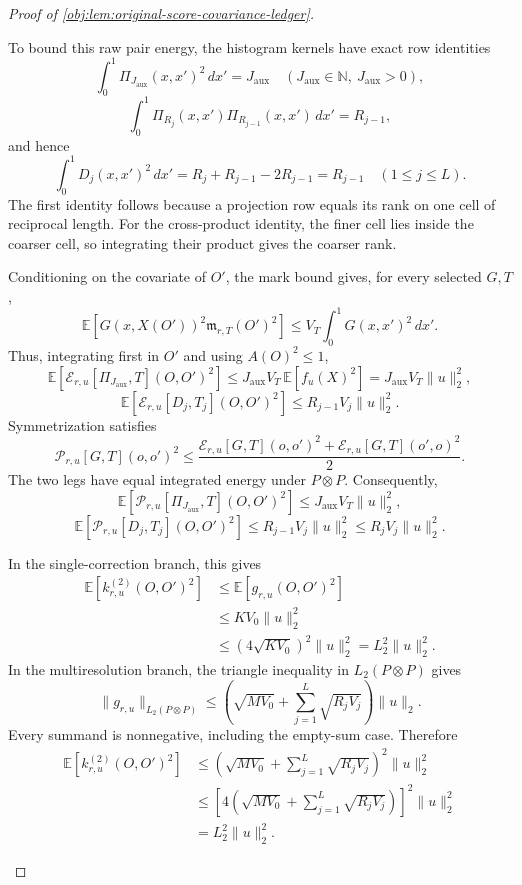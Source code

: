 \begin{proof}[Proof of \cref{obj:lem:original-score-covariance-ledger}]
\begin{enumerate}
To bound this raw pair energy, the histogram kernels have exact row identities
\[
\int_0^1\Pi_{J_{\mathrm{aux}}}(x,x')^2\,dx'
=
J_{\mathrm{aux}}
\quad(J_{\mathrm{aux}}\in\mathbb N,\ J_{\mathrm{aux}}>0),
\]
\[
\int_0^1
\Pi_{R_j}(x,x')\Pi_{R_{j-1}}(x,x')\,dx'
=
R_{j-1},
\]
and hence
\[
\int_0^1D_j(x,x')^2\,dx'
=
R_j+R_{j-1}-2R_{j-1}
=
R_{j-1}
\quad(1\le j\le L).
\]
The first identity follows because a projection row equals its rank on one cell of reciprocal length. For the cross-product identity, the finer cell lies inside the coarser cell, so integrating their product gives the coarser rank.

Conditioning on the covariate of \(O'\), the mark bound gives, for every selected \(G,T\),
\[
\mathbb E[G(x,X(O'))^2\mathfrak m_{r,T}(O')^2]
\le
V_T\int_0^1G(x,x')^2\,dx'.
\]
Thus, integrating first in \(O'\) and using \(A(O)^2\le1\),
\[
\mathbb E[\mathscr E_{r,u}[\Pi_{J_{\mathrm{aux}}},T](O,O')^2]
\le
J_{\mathrm{aux}}V_T\,\mathbb E[f_u(X)^2]
=
J_{\mathrm{aux}}V_T\|u\|_2^2,
\]
\[
\mathbb E[\mathscr E_{r,u}[D_j,T_j](O,O')^2]
\le
R_{j-1}V_j\|u\|_2^2.
\]
Symmetrization satisfies
\[
\mathscr P_{r,u}[G,T](o,o')^2
\le
\frac{
\mathscr E_{r,u}[G,T](o,o')^2
+
\mathscr E_{r,u}[G,T](o',o)^2
}{2}.
\]
The two legs have equal integrated energy under \(P\otimes P\). Consequently,
\[
\mathbb E[\mathscr P_{r,u}[\Pi_{J_{\mathrm{aux}}},T](O,O')^2]
\le
J_{\mathrm{aux}}V_T\|u\|_2^2,
\]
\[
\mathbb E[\mathscr P_{r,u}[D_j,T_j](O,O')^2]
\le
R_{j-1}V_j\|u\|_2^2
\le
R_jV_j\|u\|_2^2.
\]

In the single-correction branch, this gives
\[
\begin{aligned}
\mathbb E[k_{r,u}^{(2)}(O,O')^2]
&\le
\mathbb E[g_{r,u}(O,O')^2]\\
&\le
KV_0\|u\|_2^2\\
&\le
(4\sqrt{KV_0})^2\|u\|_2^2
=
L_2^2\|u\|_2^2.
\end{aligned}
\]
In the multiresolution branch, the triangle inequality in \(L_2(P\otimes P)\) gives
\[
\|g_{r,u}\|_{L_2(P\otimes P)}
\le
\left(
\sqrt{MV_0}
+
\sum_{j=1}^{L}\sqrt{R_jV_j}
\right)\|u\|_2.
\]
Every summand is nonnegative, including the empty-sum case. Therefore
\[
\begin{aligned}
\mathbb E[k_{r,u}^{(2)}(O,O')^2]
&\le
\left(
\sqrt{MV_0}+\sum_{j=1}^{L}\sqrt{R_jV_j}
\right)^2\|u\|_2^2\\
&\le
\left[
4\left(
\sqrt{MV_0}+\sum_{j=1}^{L}\sqrt{R_jV_j}
\right)
\right]^2\|u\|_2^2\\
&=
L_2^2\|u\|_2^2.
\end{aligned}
\]


\end{enumerate}
\end{proof}
